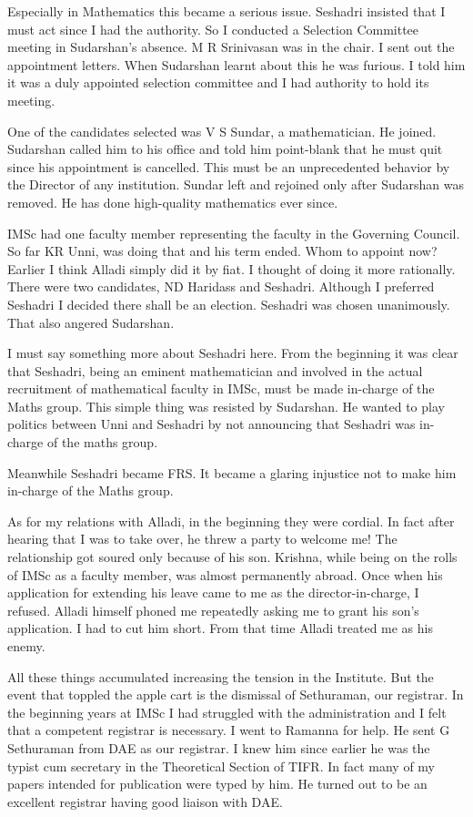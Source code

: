 Especially in Mathematics this became a serious issue. Seshadri insisted 
that I must act since I had the authority. So I conducted a Selection 
Committee meeting in Sudarshan's absence. M R Srinivasan was in the 
chair. I sent out the appointment letters. When Sudarshan learnt about 
this he was furious. I told him it was a duly appointed selection 
committee and I had authority to hold its meeting.

One of the candidates selected was V S Sundar, a mathematician. He 
joined. Sudarshan called him to his office and told him point-blank that 
he must quit since his appointment is cancelled. This must be an 
unprecedented behavior by the Director of any institution. Sundar left 
and rejoined only after Sudarshan was removed. He has done high-quality 
mathematics ever since.

IMSc had one faculty member representing the faculty in the Governing 
Council. So far KR Unni, was doing that and his term ended. Whom to 
appoint now? Earlier I think Alladi simply did it by fiat. I thought of 
doing it more rationally. There were two candidates, ND Haridass and 
Seshadri. Although I preferred Seshadri I decided there shall be an 
election. Seshadri was chosen unanimously. That also angered Sudarshan.

I must say something more about Seshadri here. From the beginning it was 
clear that Seshadri, being an eminent mathematician and involved in the 
actual recruitment of mathematical faculty in IMSc, must be made 
in-charge of the Maths group. This simple thing was resisted by 
Sudarshan. He wanted to play politics between Unni and Seshadri by not 
announcing that Seshadri was in-charge of the maths group.

Meanwhile Seshadri became FRS. It became a glaring injustice not to make 
him in-charge of the Maths group.

As for my relations with Alladi, in the beginning they were cordial. 
In fact after hearing that I was to take over, he threw a party to 
welcome me! The relationship got soured only because of his son. 
Krishna, while being on the rolls of IMSc as a faculty member, was 
almost permanently abroad. Once when his application for extending his 
leave came to me as the director-in-charge, I refused. Alladi himself 
phoned me repeatedly asking me to grant his son's application. I had to 
cut him short. From that time Alladi treated me as his enemy.
 
All these things accumulated increasing the tension in the Institute. 
But the event that toppled the apple cart is the dismissal of 
Sethuraman, our registrar. In the beginning years at IMSc I had 
struggled with the administration and I felt that a competent registrar 
is necessary. I went to Ramanna for help. He sent G Sethuraman from DAE 
as our registrar. I knew him since earlier he was the typist cum 
secretary in the Theoretical Section of TIFR. In fact many of my papers 
intended for publication were typed by him. He turned out to be an 
excellent registrar having good liaison with DAE.

